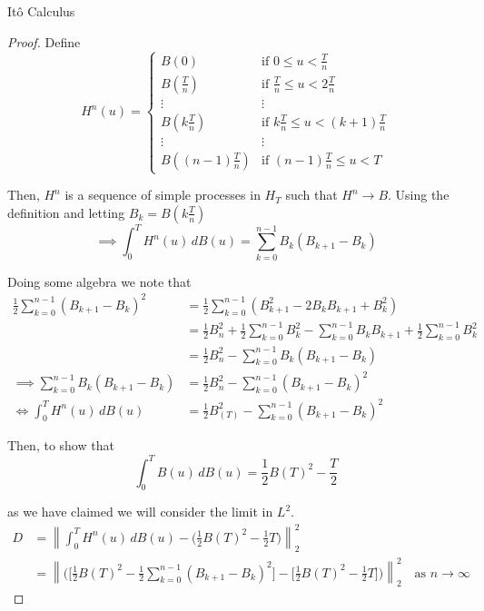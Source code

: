 \documentclass[12pt]{article}
\newcommand\norm[1]{\left\lVert#1\right\rVert} %
\newlength\tindent
\renewcommand{\indent}{\hspace*{\tindent}}
\begin{document}
\begin{section}{It\^{o} Calculus}
\begin{proof}
Define
\begin{equation*}
	H^n(u) =
		\begin{cases}
			B(0) & \text{if } 0 \leq u < \frac{T}{n} \\
			B(\frac{T}{n}) & \text{if } \frac{T}{n} \leq u < 2\frac{T}{n} \\
			\vdots & \vdots \\
			B(k\frac{T}{n}) & \text{if } k\frac{T}{n} \leq u < (k + 1)\frac{T}{n} \\
			\vdots & \vdots \\
			B((n-1)\frac{T}{n}) &\text{if } (n - 1)\frac{T}{n} \leq u < T
		\end{cases}
\end{equation*}

\indent Then, $H^n$ is a sequence of simple processes in $H_T$ such that $H^n \longrightarrow B$. Using the definition and letting $B_k = B(k\frac{T}{n})$
\begin{equation*}
	\implies \int^T_0 H^n(u)\,dB(u) = \sum^{n-1}_{k = 0} B_k(B_{k+1} - B_k)
\end{equation*}

Doing some algebra we note that 
\begin{align*}
	\frac{1}{2}\sum^{n-1}_{k=0}(B_{k+1} - B_k)^2 &= \frac{1}{2}\sum^{n-1}_{k=0}(B^2_{k+1} - 2B_kB_{k+1} + B^2_k) \\
	&= \frac{1}{2}B^2_n + \frac{1}{2}\sum^{n-1}_{k=0}B^2_k - \sum^{n-1}_{k=0}B_kB_{k+1} + \frac{1}{2}\sum^{n-1}_{k=0}B^2_k \\
	&= \frac{1}{2}B^2_n - \sum^{n-1}_{k=0}B_k(B_{k+1} - B_k) \\
	\implies \sum^{n-1}_{k = 0} B_k(B_{k+1} - B_k) &= \frac{1}{2}B_n^2 -  \sum^{n-1}_{k=0}(B_{k+1} - B_k)^2 \\
	\iff \int^T_0 H^n(u)\,dB(u) &= \frac{1}{2}B_(T)^2 -  \sum^{n-1}_{k=0}(B_{k+1} - B_k)^2
\end{align*}

Then, to show that 
\begin{equation*}
	\int^T_0 B(u)\,dB(u) = \frac{1}{2}B(T)^2 - \frac{T}{2}
\end{equation*}

as we have claimed we will consider the limit in $L^2$.
\begin{align*}
	D &= \norm{\int^T_0 H^n(u)\,dB(u) - \Big(\frac{1}{2}B(T)^2 - \frac{1}{2}T\Big)}^2_2 \\
	&= \norm{\Bigg(\Big[\frac{1}{2}B(T)^2 - \frac{1}{2}\sum^{n-1}_{k = 0}(B_{k+1} - B_k)^2\Big] - \Big[\frac{1}{2}B(T)^2 - \frac{1}{2}T\Big]\Bigg)}^2_2 \quad \text{as } n \longrightarrow \infty
\end{align*}


\end{proof}
\end{section}
\end{document}
